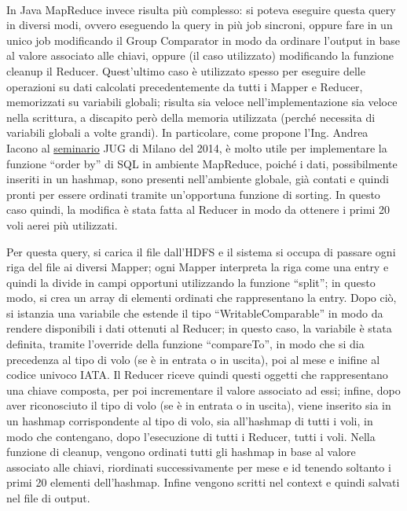 \documentclass[11pt]{article} %
\begin{document}
~

In Java MapReduce invece risulta più complesso: si poteva eseguire questa query in diversi modi, ovvero eseguendo la query in più job sincroni, oppure fare in un unico job modificando il Group Comparator in modo da ordinare l'output in base al valore associato alle chiavi, oppure (il caso utilizzato) modificando la funzione cleanup il Reducer. Quest'ultimo caso è utilizzato spesso per eseguire delle operazioni su dati calcolati precedentemente da tutti i Mapper e Reducer, memorizzati su variabili globali; risulta sia veloce nell'implementazione sia veloce nella scrittura, a discapito però della memoria utilizzata (perché necessita di variabili globali a volte grandi). In particolare, come propone l'Ing. Andrea Iacono al \href{http://www.slideshare.net/andreaiacono/mapreduce-34478449}{seminario} JUG di Milano del 2014, è molto utile per implementare la funzione ``order by'' di SQL in ambiente MapReduce, poiché i dati, possibilmente inseriti in un hashmap, sono presenti nell'ambiente globale, già contati e quindi pronti per essere ordinati tramite un'opportuna funzione di sorting. In questo caso quindi, la modifica è stata fatta al Reducer in modo da ottenere i primi 20 voli aerei più utilizzati.

Per questa query, si carica il file dall'HDFS e il sistema si occupa di passare ogni riga del file ai diversi Mapper; ogni Mapper interpreta la riga come una entry e quindi la divide in campi opportuni utilizzando la funzione ``split''; in questo modo, si crea un array di elementi ordinati che rappresentano la entry. Dopo ciò, si istanzia una variabile che estende il tipo ``WritableComparable'' in modo da rendere disponibili i dati ottenuti al Reducer; in questo caso, la variabile è stata definita, tramite l'override della funzione ``compareTo'',  in modo che si dia precedenza al tipo di volo (se è in entrata o in uscita), poi al mese e inifine al codice univoco IATA. Il Reducer riceve quindi questi oggetti che rappresentano una chiave composta, per poi incrementare il valore associato ad essi; infine, dopo aver riconosciuto il tipo di volo (se è in entrata o in uscita), viene inserito sia in un hashmap corrispondente al tipo di volo, sia all'hashmap di tutti i voli, in modo che contengano, dopo l'esecuzione di tutti i Reducer, tutti i voli. Nella funzione di cleanup, vengono ordinati tutti gli hashmap in base al valore associato alle chiavi, riordinati successivamente per mese e id tenendo soltanto i primi 20 elementi dell'hashmap. Infine vengono scritti nel context e quindi salvati nel file di output. 
\end{document}
